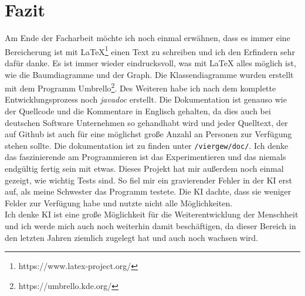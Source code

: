 \documentclass[12pt,a4paper]{article}
\def\code#1{\texttt{#1}}
\begin{document}
	\section{Fazit}
	Am Ende der Facharbeit möchte ich noch einmal erwähnen, dass es immer eine Bereicherung ist mit \LaTeX{}\footnote{https://www.latex-project.org/} einen Text zu schreiben und ich den Erfindern sehr dafür danke. Es ist immer wieder eindrucksvoll, was mit \LaTeX{} alles möglich ist, wie die Baumdiagramme und der Graph. Die Klassendiagramme wurden erstellt mit dem Programm \glqq Umbrello\grqq{}\footnote{https://umbrello.kde.org/}. Des Weiteren habe ich nach dem komplette Entwicklungsprozess noch \textit{javadoc} erstellt. Die Dokumentation ist genauso wie der Quellcode und die Kommentare in Englisch gehalten, da dies auch bei deutschen Software Unternehmen so gehandhabt wird und jeder Quelltext, der auf Github ist auch für eine möglichst große Anzahl an Personen zur Verfügung stehen sollte. Die dokumentation ist zu finden unter \code{/viergew/doc/}. Ich denke das faszinierende am Programmieren ist das Experimentieren und das niemals endgültig fertig sein mit etwas. Dieses Projekt hat mir außerdem noch einmal gezeigt, wie wichtig Tests sind. So fiel mir ein gravierender Fehler in der KI erst auf, als meine Schwester das Programm testete. Die KI dachte, dass sie weniger Felder zur Verfügung habe und nutzte nicht alle Möglichkeiten.\\
	Ich denke KI ist eine große Möglichkeit für die Weiterentwicklung der Menschheit und ich werde mich auch noch weiterhin damit beschäftigen, da dieser Bereich in den letzten Jahren ziemlich zugelegt hat und auch noch wachsen wird.
	\newpage
\end{document}
